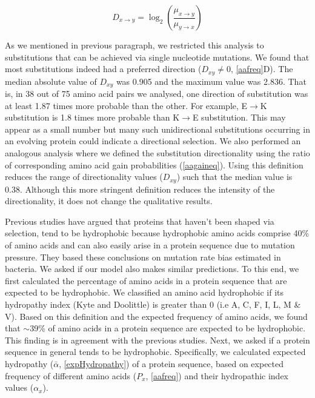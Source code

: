 \documentclass[12pt,a4paper]{article}
\begin{document}
\begin{equation}
\textit{D}_{x\to y} = \log_2\left(\frac{\mu_{x\to y}}{\mu_{y\to x}}\right)
\label{directionality}
\end{equation}

As we mentioned in previous paragraph, we restricted this analysis to substitutions that can be achieved via single nucleotide mutations. We found that most substitutions indeed had a preferred direction ($\textit{D}_{xy} \neq 0$,  \autoref{aafreq}D). The median absolute value of $\textit{D}_{xy}$ was 0.905 and the maximum value was 2.836. That is, in 38 out of 75 amino acid pairs we analysed, one direction of substitution was at least 1.87 times more probable than the other. For example, E$\to$K substitution is 1.8 times more probable than K$\to$E substitution. This may appear as a small number but many such unidirectional substitutions occurring in an evolving protein could indicate a directional selection. We also performed an analogous analysis where we defined the substitution directionality using the ratio of corresponding amino acid gain probabilities (\autoref{aagaineq}). Using this definition reduces the range of directionality values ($\textit{D}_{xy}$) such that the median value is 0.38. Although this more stringent definition reduces the intensity of the directionality, it does not change the qualitative results. 


Previous studies have argued that proteins that haven't been shaped via selection, tend to be hydrophobic because hydrophobic amino acids comprise 40\% of amino acids and can also easily arise in a protein sequence due to mutation pressure. They based these conclusions on mutation rate bias estimated in bacteria. We asked if our model also makes similar predictions. To this end, we first calculated the percentage of amino acids in a protein sequence that are expected to be hydrophobic. We classified an amino acid hydrophobic if its hydropathy index (Kyte and Doolittle) is greater than 0 (i.e A, C, F, I, L, M \& V). Based on this definition and the expected frequency of amino acids, we found that $\sim$39\% of amino acids in a protein sequence are expected to be hydrophobic. This finding is in agreement with the previous studies. Next, we asked if a protein sequence in general tends to be hydrophobic. Specifically, we calculated expected hydropathy ($\bar{\alpha}$, \autoref{expHydropathy}) of a protein sequence, based on expected frequency of different amino acids ($P_x$, \autoref{aafreq}) and their hydropathic index values ($\alpha_x$). 
\end{document}
